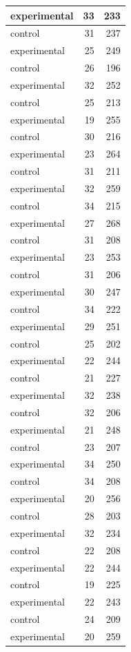 \documentclass[]{svmono}
\theoremstyle{definition}
\theoremstyle{definition}
\theoremstyle{definition}
\theoremstyle{remark}
\begin{document}
\begin{tabular}{l|r|r}
experimental & 33 & 233\\
\hline
control & 31 & 237\\
\hline
experimental & 25 & 249\\
\hline
control & 26 & 196\\
\hline
experimental & 32 & 252\\
\hline
control & 25 & 213\\
\hline
experimental & 19 & 255\\
\hline
control & 30 & 216\\
\hline
experimental & 23 & 264\\
\hline
control & 31 & 211\\
\hline
experimental & 32 & 259\\
\hline
control & 34 & 215\\
\hline
experimental & 27 & 268\\
\hline
control & 31 & 208\\
\hline
experimental & 23 & 253\\
\hline
control & 31 & 206\\
\hline
experimental & 30 & 247\\
\hline
control & 34 & 222\\
\hline
experimental & 29 & 251\\
\hline
control & 25 & 202\\
\hline
experimental & 22 & 244\\
\hline
control & 21 & 227\\
\hline
experimental & 32 & 238\\
\hline
control & 32 & 206\\
\hline
experimental & 21 & 248\\
\hline
control & 23 & 207\\
\hline
experimental & 34 & 250\\
\hline
control & 34 & 208\\
\hline
experimental & 20 & 256\\
\hline
control & 28 & 203\\
\hline
experimental & 32 & 234\\
\hline
control & 22 & 208\\
\hline
experimental & 22 & 244\\
\hline
control & 19 & 225\\
\hline
experimental & 22 & 243\\
\hline
control & 24 & 209\\
\hline
experimental & 20 & 259\\

\end{tabular}
\end{document}
